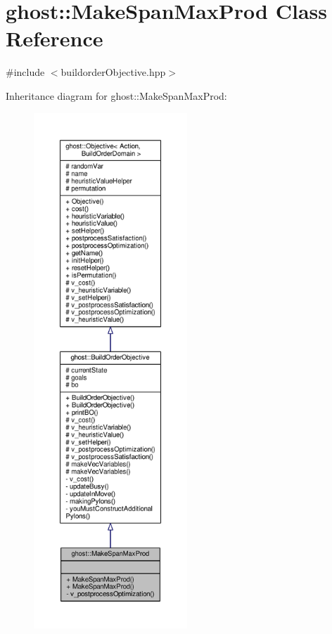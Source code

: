 \hypertarget{classghost_1_1MakeSpanMaxProd}{\section{ghost\-:\-:Make\-Span\-Max\-Prod Class Reference}
\label{classghost_1_1MakeSpanMaxProd}
}


{\ttfamily \#include $<$buildorder\-Objective.\-hpp$>$}



Inheritance diagram for ghost\-:\-:Make\-Span\-Max\-Prod\-:
\nopagebreak
\begin{figure}[H]
\begin{center}
\leavevmode
\includegraphics[height=550pt]{classghost_1_1MakeSpanMaxProd__inherit__graph}
\end{center}
\end{figure}



